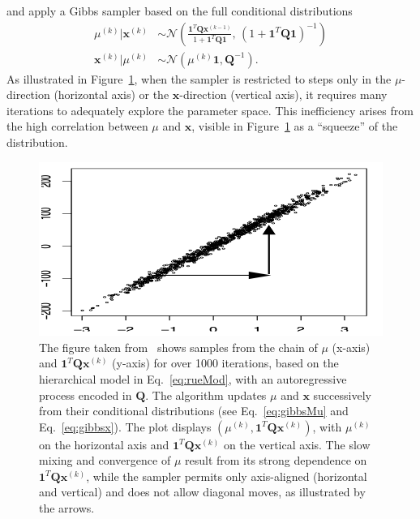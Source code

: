 and apply a Gibbs sampler based on the full conditional distributions
\begin{align}
	\mu^{(k)} | \bm{x}^{(k)} &\sim \mathcal{N} \left( \frac{\bm{1}^T \bm{Q} \bm{x}^{(k-1)}}{1 + \bm{1}^T \bm{Q} \bm{1}}, \, \left(1 + \bm{1}^T \bm{Q} \bm{1} \right)^{-1} \right) \label{eq:gibbsMu} \\
	\bm{x}^{(k)} | \mu^{(k)} &\sim \mathcal{N}(\mu^{(k)} \bm{1}, \bm{Q}^{-1})\label{eq:gibbsx}.
\end{align}
As illustrated in Figure~\ref{fig:RueHeld}, when the sampler is restricted to steps only in the $\mu$-direction (horizontal axis) or the $\bm{x}$-direction (vertical axis), it requires many iterations to adequately explore the parameter space. 
This inefficiency arises from the high correlation between $\mu$ and $\bm{x}$, visible in Figure~\ref{fig:RueHeld} as a ``squeeze'' of the distribution.
\begin{figure}[ht!]
	\centering
	\includegraphics[width = \textwidth]{Figures/RueHeldBookFig.png}
	\caption[Correlation structure in between parameters and hyper-parameters]{The figure taken from~\cite[Figure 4.1 (b)]{rue2005gaussian} shows samples from the chain of $\mu$ (x-axis) and $\bm{1}^T \bm{Q} \bm{x}^{(k)}$ (y-axis) for over 1000 iterations, based on the hierarchical model in Eq.~\ref{eq:rueMod}, with an autoregressive process encoded in $\bm{Q}$. The algorithm updates $\mu$ and $\bm{x}$ successively from their conditional distributions (see Eq.~\ref{eq:gibbsMu} and Eq.~\ref{eq:gibbsx}). The plot displays $(\mu^{(k)}, \bm{1}^T \bm{Q} \bm{x}^{(k)})$, with $\mu^{(k)}$ on the horizontal axis and $\bm{1}^T \bm{Q} \bm{x}^{(k)}$ on the vertical axis. The slow mixing and convergence of $\mu$ result from its strong dependence on $\bm{1}^T \bm{Q} \bm{x}^{(k)}$, while the sampler permits only axis-aligned (horizontal and vertical) and does not allow diagonal moves, as illustrated by the arrows.}
	\label{fig:RueHeld}
\end{figure}

